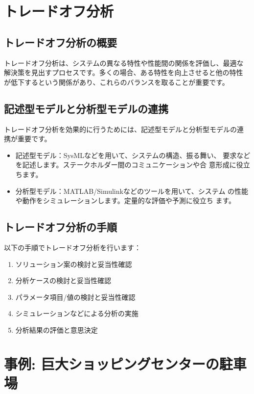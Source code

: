 \section{トレードオフ分析}

\subsection{トレードオフ分析の概要}

トレードオフ分析は、システムの異なる特性や性能間の関係を評価し、最適な
解決策を見出すプロセスです。多くの場合、ある特性を向上させると他の特性
が低下するという関係があり、これらのバランスを取ることが重要です。

\subsection{記述型モデルと分析型モデルの連携}

トレードオフ分析を効果的に行うためには、記述型モデルと分析型モデルの連
携が重要です。

\begin{itemize}
    \item 記述型モデル：SysMLなどを用いて、システムの構造、振る舞い、
      要求などを記述します。ステークホルダー間のコミュニケーションや合
      意形成に役立ちます。
    \item 分析型モデル：MATLAB/Simulinkなどのツールを用いて、システム
      の性能や動作をシミュレーションします。定量的な評価や予測に役立ち
      ます。
\end{itemize}

\subsection{トレードオフ分析の手順}

以下の手順でトレードオフ分析を行います：

\begin{enumerate}
    \item ソリューション案の検討と妥当性確認
    \item 分析ケースの検討と妥当性確認
    \item パラメータ項目/値の検討と妥当性確認
    \item シミュレーションなどによる分析の実施
    \item 分析結果の評価と意思決定
\end{enumerate}

\section{事例: 巨大ショッピングセンターの駐車場}

